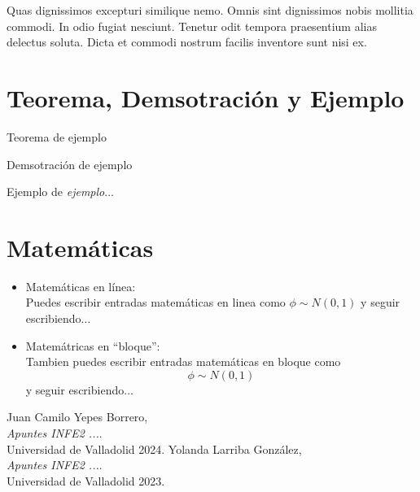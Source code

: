 \documentclass{article}
\begin{document}
Quas dignissimos excepturi similique nemo. Omnis sint dignissimos nobis mollitia commodi. In odio fugiat nesciunt. Tenetur odit tempora praesentium alias delectus soluta. Dicta et commodi nostrum facilis inventore sunt nisi ex.

\section{Teorema, Demsotración y Ejemplo}

\begin{theorem}
    Teorema de ejemplo
\end{theorem}

\begin{proofs}
    Demsotración de ejemplo
\end{proofs}

\begin{exercise}
    Ejemplo de \textit{ejemplo}$\dots$
\end{exercise}

\section{Matemáticas}

\begin{itemize}
    \item Matemáticas en línea: \\
    Puedes escribir entradas matemáticas en linea como $\phi \sim N(0,1)$ y seguir escribiendo$\dots$
    \item Matemátricas en ``bloque'': \\
    Tambien puedes escribir entradas matemáticas en bloque como 
    \[
        \phi \sim N(0,1)
    \]
    y seguir escribiendo$\dots$
\end{itemize}


\begin{thebibliography}{9}
    Juan Camilo Yepes Borrero, \\ \textit{Apuntes INFE2 ...}. \\ Universidad de Valladolid 2024.
    Yolanda Larriba González, \\ \textit{Apuntes INFE2 ...}. \\ Universidad de Valladolid 2023.
\end{thebibliography}

\end{document}
